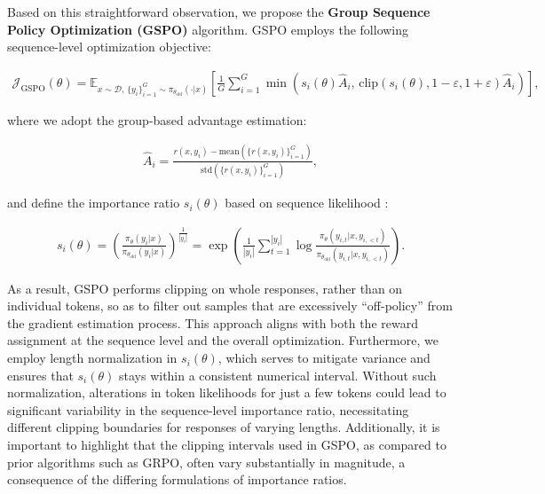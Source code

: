 Based on this straightforward observation, we propose the \textbf{Group Sequence Policy Optimization (GSPO)} algorithm. GSPO employs the following sequence-level optimization objective:

\begin{align}
\mathcal{J}_\text{GSPO} (\theta) =
\mathbb{E}_{ x \sim \mathcal{D},\, \{y_i\}_{i=1}^G \sim \pi_{\theta_\text{old}}( \cdot | x) }
\left[ 
\frac{1}{G} \sum_{i=1}^{G}
\min \left( s_{i}(\theta)  \widehat{A}_{i},  \, \mathrm{clip} \left( s_{i}(\theta), 1 - {\varepsilon}, 1 + {\varepsilon} \right) \widehat{A}_{i} \right) 
\right],
\label{equ:gspo}
\end{align}

where we adopt the group-based advantage estimation:

\begin{align}
\widehat{A}_{i} = \frac{r(x, y_i) - \mathrm{mean} \left( \{ r(x, y_i) \}_{i=1}^G \right) }{ \mathrm{std} \left( \{ r(x, y_i) \}_{i=1}^G \right) },
\end{align}

and define the importance ratio $s_{i}(\theta)$ based on sequence likelihood \citep{click}:

\begin{align}
s_{i}(\theta) = \left( \frac{ \pi_{\theta} (y_i | x) }{ \pi_{\theta_\text{old}} (y_i | x)} \right)^{\frac{1}{|y_i|}}
=
\exp \left( \frac{1}{|y_i|} \sum_{t=1}^{|y_i|} \log \frac{ \pi_{\theta} (y_{i,t} | x, y_{i,<t}) }{ \pi_{\theta_\text{old}} (y_{i,t} | x,y_{i,<t})} \right).
\end{align}

As a result, GSPO performs clipping on whole responses, rather than on individual tokens, so as to filter out samples that are excessively “off-policy” from the gradient estimation process. This approach aligns with both the reward assignment at the sequence level and the overall optimization. Furthermore, we employ length normalization in $s_{i}(\theta)$, which serves to mitigate variance and ensures that $s_{i}(\theta)$ stays within a consistent numerical interval. Without such normalization, alterations in token likelihoods for just a few tokens could lead to significant variability in the sequence-level importance ratio, necessitating different clipping boundaries for responses of varying lengths. Additionally, it is important to highlight that the clipping intervals used in GSPO, as compared to prior algorithms such as GRPO, often vary substantially in magnitude, a consequence of the differing formulations of importance ratios.

